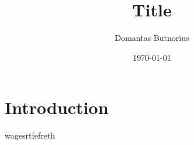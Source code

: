 \documentclass{article}
\begin{document}
\title{\textbf{Title}}
\author{Domantas Butnorius}
\date{\today}
\maketitle
{}
\newpage
{}
\tableofcontents
\section{Introduction}
wagesrtfefreth
\end{document}
